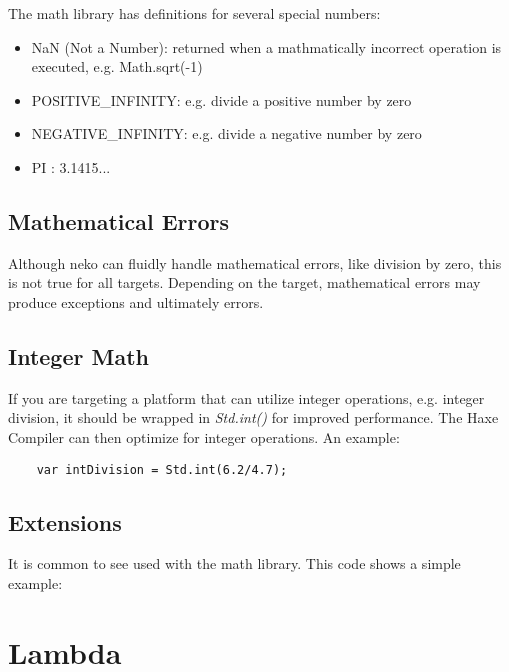 The math library has definitions for several special numbers:

\begin{itemize}
	\item NaN (Not a Number): returned when a mathmatically incorrect operation is executed, e.g. Math.sqrt(-1)
	\item POSITIVE_INFINITY: e.g. divide a positive number by zero
	\item NEGATIVE_INFINITY: e.g. divide a negative number by zero
	\item PI : 3.1415...
\end{itemize}

\subsection{Mathematical Errors}
\label{std-math-mathematical-errors}
Although neko can fluidly handle mathematical errors, like division by zero, this is not true for all targets.  Depending on the target, mathematical errors may produce exceptions and ultimately errors.

\subsection{Integer Math}
\label{std-math-integer-math}

If you are targeting a platform that can utilize integer operations, e.g. integer division, it should be wrapped in \emph{Std.int()} for improved performance.  The Haxe Compiler can then optimize for integer operations.  An example:

\begin{lstlisting}
	var intDivision = Std.int(6.2/4.7);
\end{lstlisting}


\subsection{Extensions}
\label{std-math-extensions}
It is common to see  used with the math library.  This code shows a simple example:  


\section{Lambda}
\label{std-Lambda}



